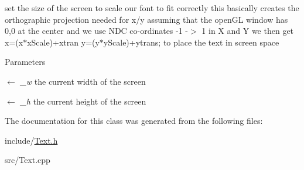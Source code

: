 set the size of the screen to scale our font to fit correctly this basically creates the orthographic projection needed for x/y assuming that the openGL window has 0,0 at the center and we use NDC co-\/ordinates -\/1 -\/$>$ 1 in X and Y we then get x=(x$\ast$xScale)+xtran y=(y$\ast$yScale)+ytrans; to place the text in screen space 
\begin{DoxyParams}{Parameters}
\item[\mbox{$\leftarrow$} {\em \_\-w}]the current width of the screen \item[\mbox{$\leftarrow$} {\em \_\-h}]the current height of the screen \end{DoxyParams}


The documentation for this class was generated from the following files:\begin{DoxyCompactItemize}
\item 
include/\hyperlink{Text_8h}{Text.h}\item 
src/Text.cpp\end{DoxyCompactItemize}
